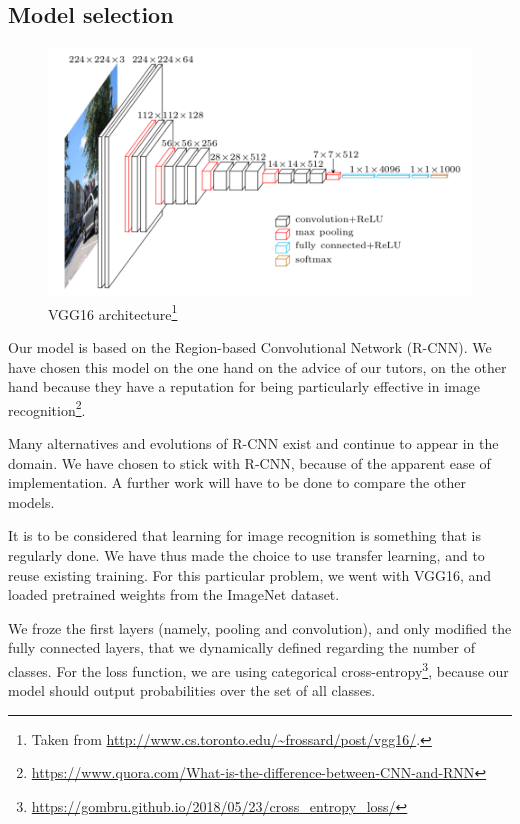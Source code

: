 \documentclass[10pt,conference,compsocconf]{IEEEtran}
\begin{document}
\subsection{Model selection}
\begin{figure}[htbp]
    \centering
    \includegraphics[width=\columnwidth]{vgg16.png}
    \caption{VGG16 architecture\footnote{Taken from \url{http://www.cs.toronto.edu/~frossard/post/vgg16/}.}}
    \vspace{-3mm}
    \label{fig:vgg}
\end{figure}

Our model is based on the Region-based Convolutional Network (R-CNN)\cite{7112511}. We have chosen this model on the one hand on the advice of our tutors, on the other hand because they have a reputation for being particularly effective in image recognition\footnote{\url{https://www.quora.com/What-is-the-difference-between-CNN-and-RNN}}.

Many alternatives and evolutions of R-CNN exist and continue to appear in the domain\cite{rohithgandhi2018}. We have chosen to stick with R-CNN, because of the apparent ease of implementation. A further work will have to be done to compare the other models.

It is to be considered that learning for image recognition is something that is regularly done. We have thus made the choice to use transfer learning\cite{prakashjay2017}, and to reuse existing training. For this particular problem, we went with VGG16\cite{simonyan2014deep}, and loaded pretrained weights from the ImageNet dataset.

We froze the first layers (namely, pooling and convolution), and only modified the fully connected layers, that we dynamically defined regarding the number of classes. For the loss function, we are using categorical cross-entropy\footnote{\url{https://gombru.github.io/2018/05/23/cross_entropy_loss/}}, because our model should output probabilities over the set of all classes.
\end{document}
